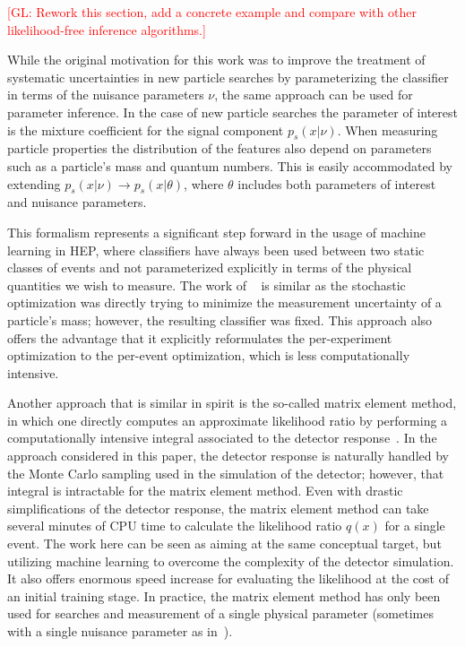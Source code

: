 \documentclass[12pt]{article}
\numberwithin{equation}{section}
\theoremstyle{plain}
\newcommand{\glnote}[1]{\textcolor{red}{[GL: #1]}}
\begin{document}
\glnote{Rework this section, add a concrete example and compare with other
likelihood-free inference algorithms.}

While the original motivation for this work was to improve the treatment of
systematic uncertainties in new particle searches by parameterizing the
classifier in terms of the nuisance parameters $\nu$, the same approach can be
used for parameter inference. In the case of new particle searches the parameter
of interest is the mixture coefficient for the signal component $p_s(x|\nu)$.
When measuring particle properties the distribution of the features also depend
on parameters such as a particle's mass and quantum numbers. This is easily
accommodated by extending $p_s(x|\nu) \to p_s(x|\theta)$, where $\theta$
includes both parameters of interest and nuisance parameters.

This formalism represents a significant step forward in the usage of machine
learning in HEP, where classifiers have always been used between two static
classes of events and not parameterized explicitly in terms of the physical
quantities we wish to measure. The work of  ~\citep{Whiteson:2006ws} is similar
as the stochastic optimization was directly trying to minimize the measurement
uncertainty of a particle's mass; however, the resulting classifier was fixed.
This approach also offers the advantage that it explicitly reformulates the
per-experiment optimization to the per-event optimization, which is less
computationally intensive.

Another approach that is similar in spirit is the so-called matrix element
method, in which one  directly computes an approximate likelihood ratio by
performing a computationally intensive integral associated to the detector
response~\citep{Volobouev:2011vb}. In the approach considered in this paper, the
detector response is naturally handled by the Monte Carlo sampling used in the
simulation of the detector; however, that integral is intractable for the matrix
element method. Even with drastic simplifications of the detector response, the
matrix element method can take several minutes of CPU time to calculate the
likelihood ratio $q(x)$ for a single event. The work here can be seen as aiming
at the same conceptual target, but utilizing machine learning to overcome the
complexity of the detector simulation. It also offers enormous speed increase
for evaluating the likelihood at the cost of an initial training stage. In
practice, the matrix element method has only been used for searches and
measurement of a single physical parameter (sometimes with a single nuisance
parameter as in~\citep{Aaltonen:2010yz}).
\end{document}
